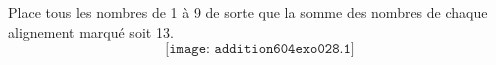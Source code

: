 Place tous les nombres de 1 à 9 de sorte que la somme des nombres de chaque alignement marqué soit 13.
\[\texttt{[image: addition604exo028.1]}\]
